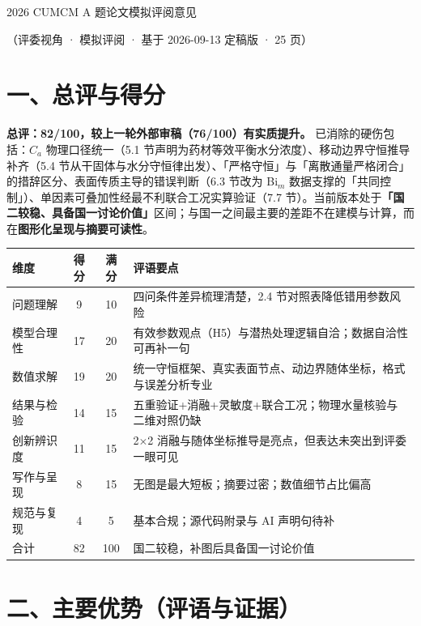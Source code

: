 \documentclass[12pt,a4paper]{ctexart}
\begin{document}
\begin{center}
{\heiti{} 2026 CUMCM A 题论文模拟评阅意见\par}
\vspace{0.4em}
{ （评委视角 · 模拟评阅 · 基于 2026-09-13 定稿版 · 25 页）\par}
\end{center}

\section{一、总评与得分}

\textbf{总评：82/100，较上一轮外部审稿（76/100）有实质提升。} 已消除的硬伤包括：$C_a$ 物理口径统一（5.1 节声明为药材等效平衡水分浓度）、移动边界守恒推导补齐（5.4 节从干固体与水分守恒律出发）、「严格守恒」与「离散通量严格闭合」的措辞区分、表面传质主导的错误判断（6.3 节改为 Bi$_m$ 数据支撑的「共同控制」）、单因素可叠加性经最不利联合工况实算验证（7.7 节）。当前版本处于\textbf{「国二较稳、具备国一讨论价值」}区间；与国一之间最主要的差距不在建模与计算，而在\textbf{图形化呈现与摘要可读性}。

\begin{center}
{\begin{tabular}{lccp{5.8cm}}
\toprule
维度 & 得分 & 满分 & 评语要点 \\
\midrule
问题理解 & 9 & 10 & 四问条件差异梳理清楚，2.4 节对照表降低错用参数风险 \\
模型合理性 & 17 & 20 & 有效参数观点（H5）与潜热处理逻辑自洽；数据自洽性可再补一句 \\
数值求解 & 19 & 20 & 统一守恒框架、真实表面节点、动边界随体坐标，格式与误差分析专业 \\
结果与检验 & 14 & 15 & 五重验证+消融+灵敏度+联合工况；物理水量核验与二维对照仍缺 \\
创新辨识度 & 11 & 15 & 2$\times$2 消融与随体坐标推导是亮点，但表达未突出到评委一眼可见 \\
写作与呈现 & 8 & 15 & 无图是最大短板；摘要过密；数值细节占比偏高 \\
规范与复现 & 4 & 5 & 基本合规；源代码附录与 AI 声明句待补 \\
\midrule
合计 & 82 & 100 & 国二较稳，补图后具备国一讨论价值 \\
\bottomrule
\end{tabular}}
\end{center}

\section{二、主要优势（评语与证据）}
\end{document}
